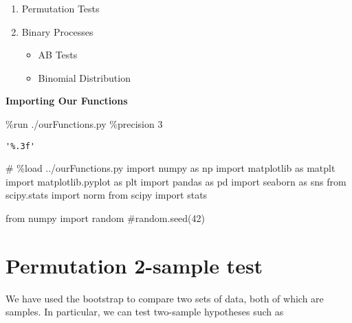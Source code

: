 \documentclass[
  letterpaper,
  DIV=11,
  numbers=noendperiod]{scrreprt}
\newenvironment{Shaded}{\begin{snugshade}}{\end{snugshade}}
\newcommand{\CommentTok}[1]{\textcolor[rgb]{0.37,0.37,0.37}{#1}}
\newcommand{\DecValTok}[1]{\textcolor[rgb]{0.68,0.00,0.00}{#1}}
\newcommand{\ImportTok}[1]{\textcolor[rgb]{0.00,0.46,0.62}{#1}}
\newcommand{\NormalTok}[1]{\textcolor[rgb]{0.00,0.23,0.31}{#1}}
\newcommand{\OperatorTok}[1]{\textcolor[rgb]{0.37,0.37,0.37}{#1}}
\providecommand{\tightlist}{%
  \setlength{\itemsep}{0pt}\setlength{\parskip}{0pt}}\usepackage{longtable,booktabs,array}
\begin{document}
\begin{enumerate}
\def\labelenumi{\arabic{enumi}.}
\tightlist
\item
  Permutation Tests
\item
  Binary Processes

  \begin{itemize}
  \tightlist
  \item
    AB Tests
  \item
    Binomial Distribution
  \end{itemize}
\end{enumerate}

\textbf{Importing Our Functions}

\begin{Shaded}
\begin{Highlighting}[]
\OperatorTok{\%}\NormalTok{run .}\OperatorTok{/}\NormalTok{ourFunctions.py}
\OperatorTok{\%}\NormalTok{precision }\DecValTok{3}
\end{Highlighting}
\end{Shaded}

\begin{verbatim}
'%.3f'
\end{verbatim}

\begin{Shaded}
\begin{Highlighting}[]
\CommentTok{\# \%load ../ourFunctions.py}
\ImportTok{import}\NormalTok{ numpy }\ImportTok{as}\NormalTok{ np}
\ImportTok{import}\NormalTok{ matplotlib }\ImportTok{as}\NormalTok{ matplt}
\ImportTok{import}\NormalTok{ matplotlib.pyplot }\ImportTok{as}\NormalTok{ plt}
\ImportTok{import}\NormalTok{ pandas }\ImportTok{as}\NormalTok{ pd}
\ImportTok{import}\NormalTok{ seaborn }\ImportTok{as}\NormalTok{ sns}
\ImportTok{from}\NormalTok{ scipy.stats }\ImportTok{import}\NormalTok{ norm}
\ImportTok{from}\NormalTok{ scipy }\ImportTok{import}\NormalTok{ stats}

\ImportTok{from}\NormalTok{ numpy }\ImportTok{import}\NormalTok{ random }
\CommentTok{\#random.seed(42)}
\end{Highlighting}
\end{Shaded}

\hypertarget{permutation-2-sample-test}{%
\section{Permutation 2-sample test}\label{permutation-2-sample-test}}

We have used the bootstrap to compare two sets of data, both of which
are samples. In particular, we can test two-sample hypotheses such as
\end{document}
